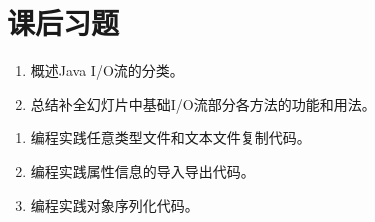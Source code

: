 \section{课后习题}


\begin{enumerate}
\item 概述Java I/O流的分类。
\item 总结补全幻灯片中基础I/O流部分各方法的功能和用法。
\end{enumerate}


\begin{enumerate}
\item 编程实践任意类型文件和文本文件复制代码。
\item 编程实践属性信息的导入导出代码。
\item 编程实践对象序列化代码。
\end{enumerate}